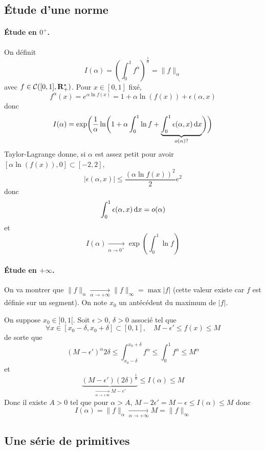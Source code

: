 \subsection{Étude d'une norme}

\paragraph{Étude en \boldmath $0^+$\unboldmath.}
On définit \[
    I(\alpha)= \left( \int_0^1f^{\alpha} \right) ^{\frac{1}{\alpha}}=\|f\|_{\alpha}
\] 
avec $f \in  \mathcal  C([0, 1], \mathbf R_+^\star)$. Pour $x \in  [0, 1]$ fixé, \[
    f^\alpha(x)=e^{\alpha \ln f(x)}=1+\alpha \ln(f(x))+\epsilon(\alpha, x)
\] 
donc \[
    I(\alpha)=\exp \biggl( \frac{1}{\alpha} \ln \biggl( 1+\alpha \int_0^1 \ln f + \underbrace{\int_0^1 \epsilon(\alpha, x)\mathop{}\!\mathrm d x}_{o(\alpha) ?} \biggr)  \biggr) 
\]
Taylor-Lagrange donne, si $\alpha$ est assez petit pour avoir $[\alpha \ln (f(x)), 0]\subset [-2, 2]$, \[
    |\epsilon(\alpha, x)| \leq  \frac{(\alpha \ln f(x))^2}{2}e^2
\] 
donc \[
    \int_0^1 \epsilon(\alpha, x)\mathop{}\!\mathrm d x=o(\alpha)
\] 
et \[
    I(\alpha) \xrightarrow[\alpha\to 0^+]{} \exp \left( \int_0^1\ln f \right) 
\] 

\paragraph{Étude en \boldmath $+\infty$\unboldmath.} On va montrer que $\|f\|_\alpha \xrightarrow[\alpha\to +\infty]{}\|f\|_{\infty}=\max |f|$ (cette valeur existe car $f$ est définie sur un segment). On note $x_0$ un antécédent du maximum de  $|f|$.

On suppose $x_0 \in  ]0, 1[$. Soit $\epsilon>0$,  $\delta>0$ associé tel que  \[
    \forall  x \in  [x_0-\delta, x_0+\delta]\subset [0, 1], \quad  M-\epsilon'\leq f(x)\leq M
\] 
de sorte que \[
    (M-\epsilon')^\alpha 2\delta\leq \int_{x_0-\delta}^{x_0+\delta}f^\alpha \leq \int_0^1f^\alpha\leq M^\alpha
\] 
et \[
    \underbrace{(M-\epsilon')(2\delta)^{\frac{1}{\alpha}}}_{\displaystyle \xrightarrow[\alpha\to +\infty]{}M-\epsilon'} \leq I(\alpha) \leq M
\] 
Donc il existe $A>0$ tel que pour  $\alpha>A$,  $M-2\epsilon'=M-\epsilon\leq I(\alpha)\leq M$ donc \[
    I(\alpha) = \|f\|_\alpha\xrightarrow[\alpha \to +\infty]{}M= \|f\|_\infty
\] 

\subsection{Une série de primitives}

